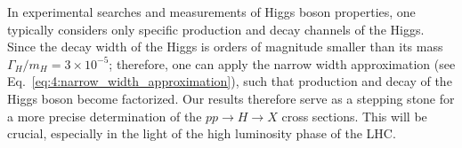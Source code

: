 In experimental searches and measurements of Higgs boson properties, one typically considers only specific production and decay channels of the Higgs. Since the decay width of the Higgs is orders of magnitude smaller than its mass $\Gamma_H /m_H = 3 \times 10^{-5}$; therefore, one can apply the narrow width approximation (see Eq.~\eqref{eq:4:narrow_width_approximation}), such that production and decay of the Higgs boson become factorized. Our results therefore serve as a stepping stone for a more precise determination of the $pp \rightarrow H \rightarrow X$ cross sections. This will be crucial, especially in the light of the high luminosity phase of the \acs{LHC}.